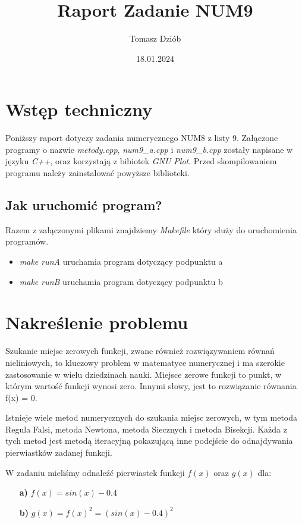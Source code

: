 \documentclass{article}
\title{Raport Zadanie NUM9}
\date{18.01.2024}
\author{Tomasz Dziób}
\begin{document}
  \maketitle
  \newpage
  \section{Wstęp techniczny}
  Poniższy raport dotyczy zadania numerycznego NUM8 z listy 9. Załączone programy o nazwie \textit{metody.cpp}, \textit{num9\_a.cpp} i \textit{num9\_b.cpp} zostały napisane w języku \textit{C++}, oraz korzystają z bibiotek \textit{GNU Plot}. Przed skompilowaniem programu należy zainstalować powyższe biblioteki.

    \subsection{Jak uruchomić program?}
    Razem z załączonymi plikami znajdziemy \textit{Makefile} który służy do uruchomienia programów.
    \begin{itemize}
      \item \textit{make runA} uruchamia program dotyczący podpunktu a
      \item \textit{make runB} uruchamia program dotyczący podpunktu b
    \end{itemize}

  \section{Nakreślenie problemu}
  Szukanie miejsc zerowych funkcji, zwane również rozwiązywaniem równań nieliniowych, to kluczowy problem w matematyce numerycznej i ma szerokie zastosowanie w wielu dziedzinach nauki. Miejsce zerowe funkcji to punkt, w którym wartość funkcji wynosi zero. Innymi słowy, jest to rozwiązanie równania f(x) = 0.


  Istnieje wiele metod numerycznych do szukania miejsc zerowych, w tym metoda Regula Falsi, metoda Newtona, metoda Siecznych i metoda Bisekcji. Każda z tych metod jest metodą iteracyjną pokazującą inne podejście do odnajdywania pierwiastków zadanej funkcji.

  W zadaniu mieliśmy odnaleźć pierwiastek funkcji $f(x)$ oraz $g(x)$ dla:

  \begin{enumerate}
    \item [\bf{a)}] $f(x) = sin(x) - 0.4$
    \item [\bf{b)}] $g(x) = f(x)^2 = (sin(x) - 0.4)^2$
  \end{enumerate}
\end{document}

